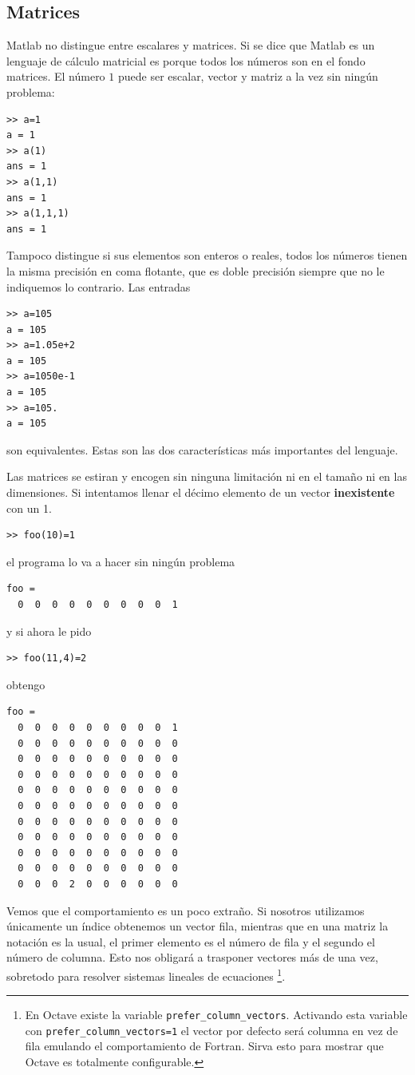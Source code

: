 \subsection{Matrices}

Matlab no distingue entre escalares y matrices. Si se dice que Matlab
es un lenguaje de cálculo matricial es porque todos los números son en
el fondo matrices. El número $1$ puede ser escalar, vector y matriz a
la vez sin ningún problema:

\begin{verbatim}
>> a=1
a = 1
>> a(1)
ans = 1
>> a(1,1)
ans = 1
>> a(1,1,1)
ans = 1
\end{verbatim}
Tampoco distingue si sus elementos son enteros o reales, todos los
números tienen la misma precisión en coma flotante, que es doble
precisión siempre que no le indiquemos lo contrario. Las entradas

\begin{verbatim}
>> a=105
a = 105
>> a=1.05e+2
a = 105
>> a=1050e-1
a = 105
>> a=105.
a = 105
\end{verbatim}

son equivalentes. Estas son las dos características más importantes
del lenguaje.

Las matrices se estiran y encogen sin ninguna limitación ni en el
tamaño ni en las dimensiones. Si intentamos llenar el décimo elemento
de un vector \textbf{inexistente} con un 1.

\begin{verbatim}
>> foo(10)=1
\end{verbatim}
el programa lo va a hacer sin ningún problema

\begin{verbatim}
foo =   
  0  0  0  0  0  0  0  0  0  1
\end{verbatim}
y si ahora le pido

\begin{verbatim}
>> foo(11,4)=2
\end{verbatim}
obtengo

\begin{verbatim}
foo =   
  0  0  0  0  0  0  0  0  0  1   
  0  0  0  0  0  0  0  0  0  0   
  0  0  0  0  0  0  0  0  0  0   
  0  0  0  0  0  0  0  0  0  0   
  0  0  0  0  0  0  0  0  0  0   
  0  0  0  0  0  0  0  0  0  0   
  0  0  0  0  0  0  0  0  0  0   
  0  0  0  0  0  0  0  0  0  0   
  0  0  0  0  0  0  0  0  0  0   
  0  0  0  0  0  0  0  0  0  0   
  0  0  0  2  0  0  0  0  0  0
\end{verbatim}
Vemos que el comportamiento es un poco extraño. Si nosotros utilizamos
únicamente un índice obtenemos un vector fila, mientras que en una
matriz la notación es la usual, el primer elemento es el número de
fila y el segundo el número de columna. Esto nos obligará a trasponer
vectores más de una vez, sobretodo para resolver sistemas lineales de
ecuaciones%
\footnote{En Octave existe la variable
  \texttt{prefer\_column\_vectors}. Activando esta variable con
  \texttt{prefer\_column\_vectors=1} el vector por defecto será
  columna en vez de fila emulando el comportamiento de Fortran. Sirva
  esto para mostrar que Octave es totalmente configurable.%
}.

